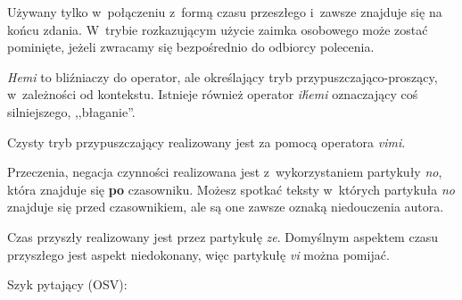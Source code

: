 \begin{spacing}{1.1}
Używany tylko w~połączeniu z~formą czasu przeszłego i~zawsze 
znajduje się na końcu zdania. W~trybie rozkazującym użycie zaimka osobowego 
może zostać pominięte, jeżeli zwracamy się bezpośrednio do odbiorcy polecenia.



\emph{Hemi} to bliźniaczy do operator, ale określający tryb 
przypuszczająco-proszący, w~zależności od kontekstu. Istnieje również operator 
\emph{ih́emi} oznaczający coś silniejszego, ,,błaganie''.



Czysty tryb przypuszczający realizowany jest za pomocą operatora \emph{vimi}.


Przeczenia, negacja czynności realizowana jest z~wykorzystaniem partykuły 
\emph{no}, która znajduje się \textbf{po} czasowniku. Możesz spotkać teksty
w~których partykuła \emph{no} znajduje się przed czasownikiem, ale są one
zawsze oznaką niedouczenia autora.





Czas przyszły realizowany jest przez partykułę \emph{ze}. Domyślnym aspektem 
czasu przyszłego jest aspekt niedokonany, więc partykułę \emph{vi} można 
pomijać.




Szyk pytający (OSV):





\end{spacing}
